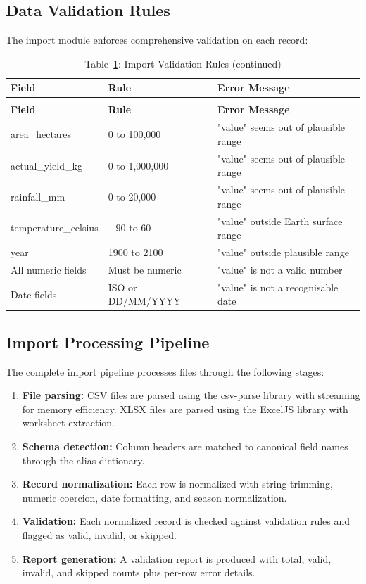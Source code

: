 \subsection{Data Validation Rules}

The import module enforces comprehensive validation on each record:

\begin{longtable}{lll}
\caption{Import Validation Rules}
\label{tab:validation-rules} \\
\toprule
\textbf{Field} & \textbf{Rule} & \textbf{Error Message} \\
\midrule
\endfirsthead
\caption*{Table~\ref{tab:validation-rules}: Import Validation Rules (continued)} \\
\toprule
\textbf{Field} & \textbf{Rule} & \textbf{Error Message} \\
\midrule
\endhead
\midrule
\endfoot
\bottomrule
\endlastfoot
area\_hectares & 0 to 100,000 & "{value}" seems out of plausible range \\
actual\_yield\_kg & 0 to 1,000,000 & "{value}" seems out of plausible range \\
rainfall\_mm & 0 to 20,000 & "{value}" seems out of plausible range \\
temperature\_celsius & $-90$ to $60$ & "{value}" outside Earth surface range \\
year & 1900 to 2100 & "{value}" outside plausible range \\
All numeric fields & Must be numeric & "{value}" is not a valid number \\
Date fields & ISO or DD/MM/YYYY & "{value}" is not a recognisable date \\
\end{longtable}

\subsection{Import Processing Pipeline}

The complete import pipeline processes files through the following stages:
\begin{enumerate}
  \item \textbf{File parsing:} CSV files are parsed using the csv-parse library with streaming for memory efficiency. XLSX files are parsed using the ExcelJS library with worksheet extraction.
  \item \textbf{Schema detection:} Column headers are matched to canonical field names through the alias dictionary.
  \item \textbf{Record normalization:} Each row is normalized with string trimming, numeric coercion, date formatting, and season normalization.
  \item \textbf{Validation:} Each normalized record is checked against validation rules and flagged as valid, invalid, or skipped.
  \item \textbf{Report generation:} A validation report is produced with total, valid, invalid, and skipped counts plus per-row error details.
\end{enumerate}

